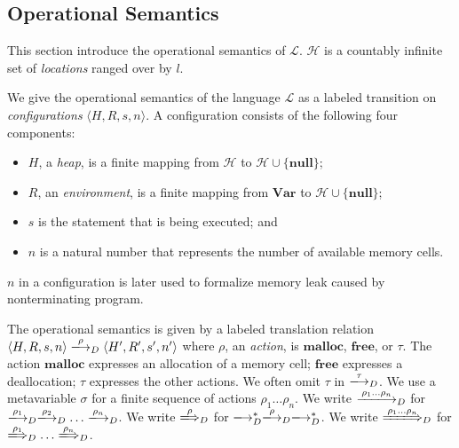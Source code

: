 \documentclass[english]{jssst_ppl} %
\newcommand\NULL{\mathbf{null}}
\newcommand\coma{,\;}
\newcommand\Malloc{\mathbf{malloc}}
\newcommand\Free{\mathbf{free}}
\newcommand\set[1]{\{#1\}}
\newcommand\VAR{\mathbf{Var}}
\theoremstyle{definition}
\begin{document}
\subsection{Operational Semantics}
\label{sec:languageSemantics}

This section introduce the operational semantics of \(\mathcal{L}\).
\(\mathcal{H}\) is a countably infinite set of \emph{locations} ranged
over by \(l\).

We give the operational semantics of the language \(\mathcal{L}\) as a
labeled transition on \emph{configurations} \(\langle H, R, s, n
\rangle\).  A configuration consists of the following four components:
\begin{itemize}
\item \(H\), a \emph{heap}, is a finite mapping from \(\mathcal{H}\)
  to \(\mathcal{H} \cup \set{\NULL}\);
\item \(R\), an \emph{environment}, is a finite mapping from \(\VAR\)
  to \(\mathcal{H} \cup \set{\NULL}\);
\item \(s\) is the statement that is being executed; and
\item \(n\) is a natural number that represents the number of
  available memory cells.
\end{itemize}
\(n\) in a configuration is later used to formalize memory leak caused
by nonterminating program.

The operational semantics is given by a labeled translation relation
\(\langle H, R, s, n \rangle \xlongrightarrow{\rho}_D \langle H', R',
s', n' \rangle\) where \(\rho\), an \emph{action}, is \(\Malloc\),
\(\Free\), or \(\tau\).  The action \(\Malloc\) expresses an
allocation of a memory cell; \(\Free\) expresses a deallocation;
\(\tau\) expresses the other actions.  We often omit \(\tau\) in
\(\xlongrightarrow{\tau}_D\).  We use a metavariable \(\sigma\) for a
finite sequence of actions \(\rho_1\dots\rho_n\).  We write
\(\xlongrightarrow{\rho_1\dots\rho_n}_D\) for
\(\xlongrightarrow{\rho_1}_D\xlongrightarrow{\rho_2}_D\dots\xlongrightarrow{\rho_n}_D\).
We write \(\xLongrightarrow{\rho}_D\) for
\(\xlongrightarrow{}_D^*\xlongrightarrow{\rho}_D\xlongrightarrow{}_D^*\).
We write \(\xLongrightarrow{\rho_1\dots\rho_n}_D\) for
\(\xLongrightarrow{\rho_1}_D\dots\xLongrightarrow{\rho_n}_D\).

\end{document}
